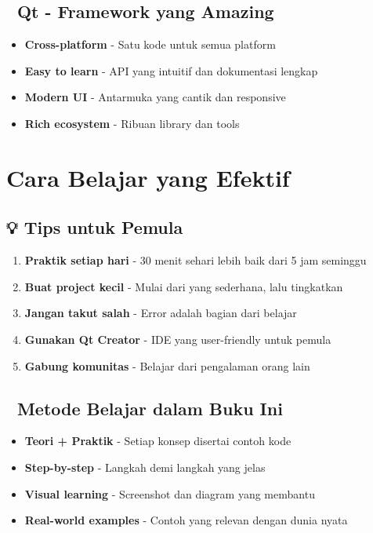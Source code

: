 \subsection*{🎨 Qt - Framework yang Amazing}
\begin{itemize}
\item \textbf{Cross-platform} - Satu kode untuk semua platform
\item \textbf{Easy to learn} - API yang intuitif dan dokumentasi lengkap
\item \textbf{Modern UI} - Antarmuka yang cantik dan responsive
\item \textbf{Rich ecosystem} - Ribuan library dan tools
\end{itemize}

\section*{Cara Belajar yang Efektif}

\subsection*{💡 Tips untuk Pemula}
\begin{enumerate}
\item \textbf{Praktik setiap hari} - 30 menit sehari lebih baik dari 5 jam seminggu
\item \textbf{Buat project kecil} - Mulai dari yang sederhana, lalu tingkatkan
\item \textbf{Jangan takut salah} - Error adalah bagian dari belajar
\item \textbf{Gunakan Qt Creator} - IDE yang user-friendly untuk pemula
\item \textbf{Gabung komunitas} - Belajar dari pengalaman orang lain
\end{enumerate}

\subsection*{🎯 Metode Belajar dalam Buku Ini}
\begin{itemize}
\item \textbf{Teori + Praktik} - Setiap konsep disertai contoh kode
\item \textbf{Step-by-step} - Langkah demi langkah yang jelas
\item \textbf{Visual learning} - Screenshot dan diagram yang membantu
\item \textbf{Real-world examples} - Contoh yang relevan dengan dunia nyata
\end{itemize}

